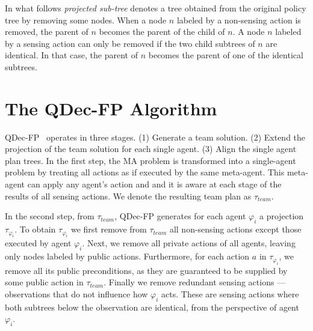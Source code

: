 \documentclass[letterpaper]{article} %
\theoremstyle{definition}
\begin{document}
In what follows  {\em projected sub-tree} denotes a tree  obtained from the original policy tree by removing some nodes. When a node $n$ labeled by a non-sensing action is removed, the parent of $n$ becomes the parent of the child of $n$. A node $n$ labeled by a sensing action can only be removed if the two child subtrees of $n$ are identical. In that case, the parent of $n$ becomes the parent of one of the identical subtrees.





\section{The QDec-FP Algorithm}

QDec-FP~\citep{ShekharBS19} operates in three stages. (1) Generate a team solution. (2) Extend the projection of the team solution for each single agent. (3) Align the single agent plan trees.
In the first step, the MA problem is transformed into a single-agent problem by treating all actions as if executed by the same meta-agent. This meta-agent can apply any agent's action and and it is aware at each stage of the results of all sensing actions. We denote the resulting team plan as $\tau_{team}$.

In the second step, from $\tau_{team}$, QDec-FP generates for each agent $\varphi_i$ a projection $\tau_{\varphi_i}$. To obtain $\tau_{\varphi_i}$ we first remove from $\tau_{team}$ all non-sensing actions except those executed by agent $\varphi_i$. Next, we remove all private actions of all agents, leaving only nodes labeled by public actions.
Furthermore, for each action $a$ in $\tau_{\varphi_i}$, we remove all its public preconditions, as they are guaranteed to be supplied by some public action in $\tau_{team}$. 
Finally we remove redundant sensing actions --- observations that do not influence how $\varphi_i$ acts. These are sensing actions where both subtrees below the observation are identical, from the perspective of agent $\varphi_i$. 
\end{document}
